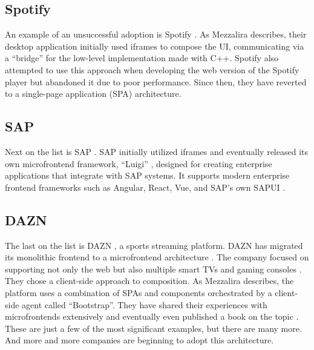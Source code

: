 \subsection{Spotify}
An example of an unsuccessful adoption is Spotify \cite{Spotify}. As Mezzalira \cite{MezzaliraBuildingMf} describes, their desktop application initially used iframes to compose the UI, communicating via a ``bridge'' for the low-level implementation made with C++. Spotify also attempted to use this approach when developing the web version of the Spotify player but abandoned it due to poor performance. Since then, they have reverted to a single-page application (SPA) architecture.\\

\subsection{SAP}
Next on the list is SAP \cite{SAP}. SAP initially utilized iframes and eventually released its own microfrontend framework, ``Luigi'' \cite{Luigi}, designed for creating enterprise applications that integrate with SAP systems. It supports modern enterprise frontend frameworks such as Angular, React, Vue, and SAP's own SAPUI \cite{MezzaliraBuildingMf}. \\

\subsection{DAZN}
The last on the list is DAZN \cite{DAZN}, a sports streaming platform. DAZN has migrated its monolithic frontend to a microfrontend architecture \cite{Geers}. The company focused on supporting not only the web but also multiple smart TVs and gaming consoles \cite{MezzaliraBuildingMf}. They chose a client-side approach to composition. As Mezzalira \cite{MezzaliraBuildingMf} describes, the platform uses a combination of SPAs and components orchestrated by a client-side agent called ``Bootstrap''. They have shared their experiences with microfrontends extensively and eventually even published a book on the topic \cite{MezzaliraBuildingMf}. \\

\noindent
These are just a few of the most significant examples, but there are many more. And more and more companies are beginning to adopt this architecture.